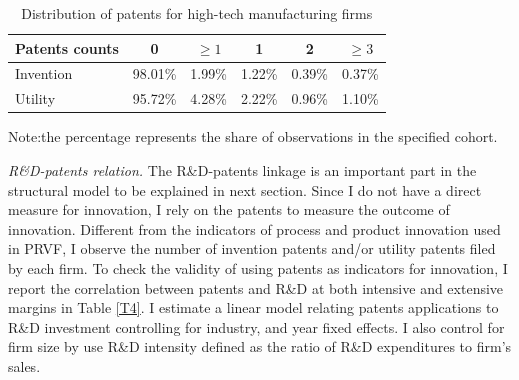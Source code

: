 \documentclass[11pt]{article}
\begin{document}
\begin{table}[h]
\centering
\caption{Distribution of patents for high-tech manufacturing firms}
\label{T3}
\begin{tabular}{lccccc}
\toprule
Patents counts & 0       & $\geq 1$ & 1      & 2      & $\geq 3$ \\
\hline
Invention&98.01\% & 1.99\% & 1.22\% & 0.39\% & 0.37\% \\
Utility&95.72\% & 4.28\% & 2.22\% & 0.96\% & 1.10\% \\ \bottomrule
\end{tabular}

{\small{}Note:the percentage represents the share of observations in the specified cohort.}{\small \par}
\end{table}

\textit{R\&D-patents relation.} The R\&D-patents linkage is an important part in the structural model to be explained in next section. Since I do not have a direct measure for innovation, I rely on the patents to measure the outcome of innovation. Different from the indicators of process and product innovation used in PRVF, I observe the number of invention patents and/or utility patents filed by each firm. To check the validity of using patents as indicators for innovation, I report the correlation between patents and R\&D at both intensive and extensive margins in Table \ref{T4}. I estimate a linear model relating patents applications to R\&D investment controlling for industry, and year fixed effects. I also control for firm size by use R\&D intensity defined as the ratio of R\&D expenditures to firm's sales. 
\end{document}
